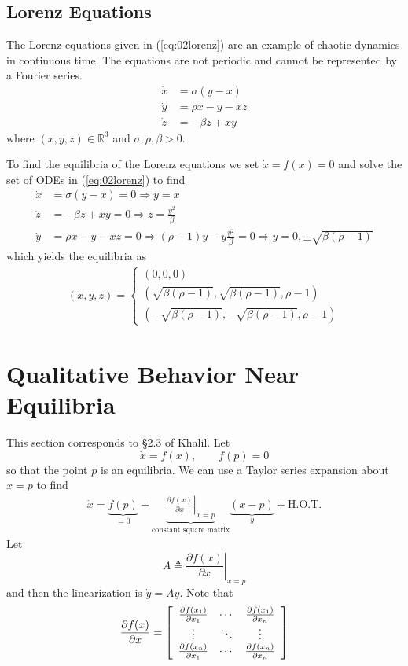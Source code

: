 \subsection{Lorenz Equations}
The Lorenz equations given in (\ref{eq:02lorenz}) are an example of chaotic dynamics in continuous time. The equations are not periodic and cannot be represented by a Fourier series.
\begin{align}
\label{eq:02lorenz}
\dot{x} &= \sigma(y - x) \nonumber \\
\dot{y} &= \rho x - y - xz \\
\dot{z} &= -\beta z + xy \nonumber
\end{align}
where $(x,y,z)\in\mathbb{R}^3$ and $\sigma, \rho, \beta > 0$.

To find the equilibria of the Lorenz equations we set $\dot{x}=f(x)=0$ and solve the set of ODEs in (\ref{eq:02lorenz}) to find
\begin{align*}
\dot{x} &= \sigma(y-x) = 0 \Rightarrow y = x \\
\dot{z} &= -\beta z + xy = 0 \Rightarrow z = \frac{y^2}{\beta} \\
\dot{y} &= \rho x-y-xz = 0 \Rightarrow (\rho-1)y - y\frac{y^2}{\beta} = 0 \Rightarrow y = 0, \pm\sqrt{\beta(\rho-1)}
\end{align*}
which yields the equilibria as
\begin{align*}
(x,y,z) = \begin{cases} (0,0,0) \\ (\sqrt{\beta(\rho-1)}, \sqrt{\beta(\rho-1)}, \rho-1) \\ (-\sqrt{\beta(\rho-1)}, -\sqrt{\beta(\rho-1)}, \rho-1) \end{cases}
\end{align*}

\section{Qualitative Behavior Near Equilibria}
This section corresponds to \S2.3 of Khalil. Let
$$\dot{x} = f(x), \qquad f(p) = 0$$
so that the point $p$ is an equilibria. We can use a Taylor series expansion about $x=p$ to find
\begin{align*}
\dot{x} = \underbrace{f(p)}_{=0} + \underbrace{\left.\frac{\partial f(x)}{\partial x}\right|_{x=p}}_{\text{constant square matrix}} \underbrace{(x-p)}_{y} + \text{H.O.T.}
\end{align*}
Let
$$A \triangleq \left.\frac{\partial f(x)}{\partial x}\right|_{x=p}$$
and then the linearization is $\dot{y}=Ay$. Note that
\begin{align*}
\frac{\partial f(x)}{\partial x} = \left[\begin{array}{c c c} \frac{\partial f(x_1)}{\partial x_1} & \cdots & \frac{\partial f(x_1)}{\partial x_n} \\ \vdots & \ddots & \vdots \\ \frac{\partial f(x_n)}{\partial x_1} & \cdots & \frac{\partial f(x_n)}{\partial x_n} \end{array}\right]
\end{align*}

